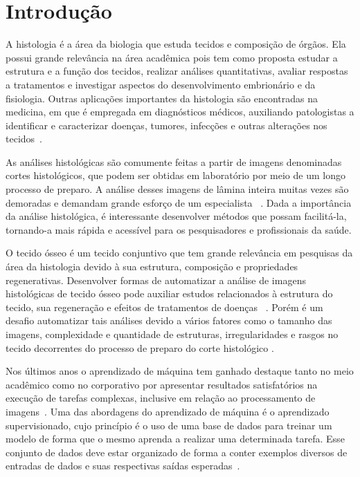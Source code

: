 \chapter[Introdução]{Introdução}

A histologia é a área da biologia que estuda tecidos e composição de órgãos. Ela possui grande relevância na área acadêmica pois tem como proposta estudar a estrutura e a função dos tecidos, realizar análises quantitativas, avaliar respostas a tratamentos e investigar aspectos do desenvolvimento embrionário e da fisiologia. Outras aplicações importantes da histologia são encontradas na medicina, em que é empregada em diagnósticos médicos, auxiliando patologistas a identificar e caracterizar doenças, tumores, infecções e outras alterações nos tecidos~\cite{junqueira1985histologia}. 

As análises histológicas são comumente feitas a partir de imagens denominadas cortes histológicos, que podem ser obtidas em laboratório por meio de um longo processo de preparo. A análise desses imagens de lâmina inteira muitas vezes são demoradas e demandam grande esforço de um especialista ~\cite{linhares2022automated}. Dada a importância da análise histológica, é interessante desenvolver métodos que possam facilitá-la, tornando-a mais rápida e acessível para os pesquisadores e profissionais da saúde.

 O tecido ósseo é um tecido conjuntivo que tem grande relevância em pesquisas da área da histologia devido à sua estrutura, composição e propriedades regenerativas. Desenvolver formas de automatizar a análise de imagens histológicas de tecido ósseo pode auxiliar estudos relacionados à estrutura do tecido, sua regeneração e efeitos de tratamentos de doenças ~\cite{linhares2019melhoria}. Porém é um desafio automatizar tais análises devido a vários fatores como o tamanho das imagens, complexidade e quantidade de estruturas, irregularidades e rasgos no tecido decorrentes do processo de preparo do corte histológico \cite{gondim2021automatic}.


Nos últimos anos o aprendizado de máquina tem ganhado destaque tanto no meio acadêmico como no corporativo por apresentar resultados satisfatórios na execução de tarefas complexas, inclusive em relação ao processamento de imagens~\cite{miklosik2020impact}. Uma das abordagens do aprendizado de máquina é o aprendizado supervisionado, cujo princípio é o uso de uma base de dados para treinar um modelo de forma que o mesmo aprenda a realizar uma determinada tarefa. Esse conjunto de dados deve estar organizado de forma a conter exemplos diversos de entradas de dados e suas respectivas saídas esperadas~\cite{monard2003conceitos}. 
    
